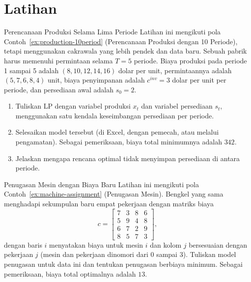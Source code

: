 \section{Latihan}


\begin{ex}{Perencanaan Produksi Selama Lima Periode}{}
\label{ex:production-5period-warmup}
 Latihan ini mengikuti pola Contoh~\ref{ex:production-10period} (Perencanaan Produksi dengan 10 Periode), tetapi menggunakan cakrawala yang lebih pendek dan data baru. Sebuah pabrik harus memenuhi permintaan selama $T = 5$ periode. Biaya produksi pada periode 1 sampai 5 adalah $(8, 10, 12, 14, 16)$ dolar per unit, permintaannya adalah $(5, 7, 6, 8, 4)$ unit, biaya penyimpanan adalah $c^{inv} = 3$ dolar per unit per periode, dan persediaan awal adalah $s_0 = 2$.
\begin{enumerate}
\item Tuliskan LP dengan variabel produksi $x_t$ dan variabel persediaan $s_t$, menggunakan satu kendala keseimbangan persediaan per periode.
\item Selesaikan model tersebut (di Excel, dengan pemecah, atau melalui pengamatan). Sebagai pemeriksaan, biaya total minimumnya adalah $342$.
\item Jelaskan mengapa rencana optimal tidak menyimpan persediaan di antara periode.
\end{enumerate}
\end{ex}

\begin{ex}{Penugasan Mesin dengan Biaya Baru}{}
\label{ex:machine-assignment-warmup}
 Latihan ini mengikuti pola Contoh~\ref{ex:machine-assignment} (Penugasan Mesin). Bengkel yang sama menghadapi sekumpulan baru empat pekerjaan dengan matriks biaya
\[
c = \begin{bmatrix} 7 & 3 & 8 & 6 \\ 5 & 9 & 4 & 8 \\ 6 & 7 & 2 & 9 \\ 8 & 5 & 7 & 3 \end{bmatrix},
\]
dengan baris $i$ menyatakan biaya untuk mesin $i$ dan kolom $j$ bersesuaian dengan pekerjaan $j$ (mesin dan pekerjaan dinomori dari $0$ sampai $3$). Tuliskan model penugasan untuk data ini dan tentukan penugasan berbiaya minimum. Sebagai pemeriksaan, biaya total optimalnya adalah $13$.
\end{ex}

